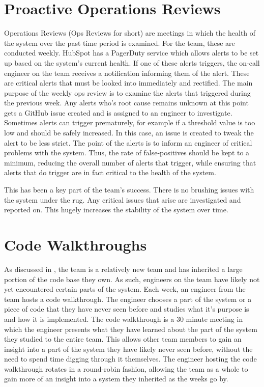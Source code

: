 \section{Proactive Operations Reviews}
Operations Reviews (Ops Reviews for short) are meetings in which the health of the system over the past time period is examined. For the \team{} team, these are conducted weekly. HubSpot has a PagerDuty service which allows alerts to be set up based on the system's current health. If one of these alerts triggers, the on-call engineer on the team receives a notification informing them of the alert. These are critical alerts that must be looked into immediately and rectified. The main purpose of the weekly ops review is to examine the alerts that triggered during the previous week. Any alerts who's root cause remains unknown at this point gets a GitHub issue created and is assigned to an engineer to investigate. Sometimes alerts can trigger prematurely, for example if a threshold value is too low and should be safely increased. In this case, an issue is created to tweak the alert to be less strict. The point of the alerts is to inform an engineer of critical problems with the system. Thus, the rate of false-positives should be kept to a minimum, reducing the overall number of alerts that trigger, while ensuring that alerts that do trigger are in fact critical to the health of the system.

This has been a key part of the \team{} team's success. There is no brushing issues with the system under the rug. Any critical issues that arise are investigated and reported on. This hugely increases the stability of the system over time. 

\section{Code Walkthroughs}
As discussed in , the \team{} team is a relatively new team and has inherited a large portion of the code base they own. As such, engineers on the team have likely not yet encountered certain parts of the system. Each week, an engineer from the team hosts a code walkthrough. The engineer chooses a part of the system or a piece of code that they have never seen before and studies what it's purpose is and how it is implemented. The code walkthrough is a 30 minute meeting in which the engineer presents what they have learned about the part of the system they studied to the entire team. This allows other team members to gain an insight into a part of the system they have likely never seen before, without the need to spend time digging through it themselves. The engineer hosting the code walkthrough rotates in a round-robin fashion, allowing the team as a whole to gain more of an insight into a system they inherited as the weeks go by. 

